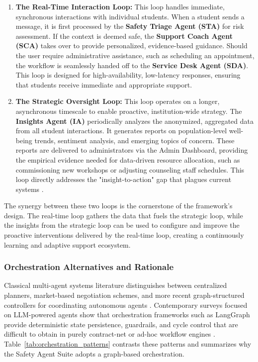 \begin{enumerate}
    \item \textbf{The Real-Time Interaction Loop:} This loop handles immediate, synchronous interactions with individual students. When a student sends a message, it is first processed by the \textbf{Safety Triage Agent (STA)} for risk assessment. If the context is deemed safe, the \textbf{Support Coach Agent (SCA)} takes over to provide personalized, evidence-based guidance. Should the user require administrative assistance, such as scheduling an appointment, the workflow is seamlessly handed off to the \textbf{Service Desk Agent (SDA)}. This loop is designed for high-availability, low-latency responses, ensuring that students receive immediate and appropriate support.
    \item \textbf{The Strategic Oversight Loop:} This loop operates on a longer, asynchronous timescale to enable proactive, institution-wide strategy. The \textbf{Insights Agent (IA)} periodically analyzes the anonymized, aggregated data from all student interactions. It generates reports on population-level well-being trends, sentiment analysis, and emerging topics of concern. These reports are delivered to administrators via the Admin Dashboard, providing the empirical evidence needed for data-driven resource allocation, such as commissioning new workshops or adjusting counseling staff schedules. This loop directly addresses the "insight-to-action" gap that plagues current systems \cite{nwoke2025insightautomation, jorno2018actionableinsight}.
\end{enumerate}

The synergy between these two loops is the cornerstone of the framework's design. The real-time loop gathers the data that fuels the strategic loop, while the insights from the strategic loop can be used to configure and improve the proactive interventions delivered by the real-time loop, creating a continuously learning and adaptive support ecosystem.

\subsubsection{Orchestration Alternatives and Rationale}

Classical multi-agent systems literature distinguishes between centralized planners, market-based negotiation schemes, and more recent graph-structured controllers for coordinating autonomous agents \cite{wooldridge1995intelligentagents,wooldridge2009introductionmas}. Contemporary surveys focused on LLM-powered agents show that orchestration frameworks such as LangGraph provide deterministic state persistence, guardrails, and cycle control that are difficult to obtain in purely contract-net or ad-hoc workflow engines \cite{yang2025aiagentprotocols,tran2025multiagentcollaboration,yu2025agentworkflow}. Table~\ref{tab:orchestration_patterns} contrasts these patterns and summarizes why the Safety Agent Suite adopts a graph-based orchestration.

